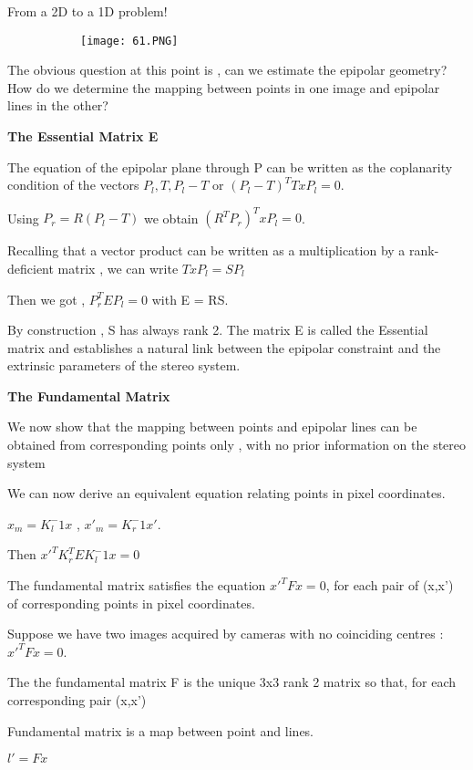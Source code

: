 \documentclass{article}
\begin{document}
From a 2D to a 1D problem!

\begin{figure}[ht!]
  \centering
  \begin{subfigure}[b]{0.6\linewidth}
    \texttt{[image: 61.PNG]}
  \end{subfigure}
\end{figure}

The obvious question at this point is , can we estimate the epipolar geometry? How do we determine the mapping between points in one image and epipolar lines in the other?

\textbf{The Essential Matrix E}

The equation of the epipolar plane through P can be written as the coplanarity condition of the vectors $P_l,T,P_l - T$ or $(P_l - T)^T T x P_l = 0$.

Using  $P_r = R(P_l -T)$ we obtain $(R^T P_r)^T x P_l = 0$.

Recalling that a vector product can be written as a multiplication by a rank-deficient matrix , we can write $T x P_l = SP_l$

Then we got , $P_r^TEP_l = 0$ with E = RS.

By construction , S has always rank 2. The matrix E is called the Essential matrix and establishes a natural link between the epipolar constraint and the extrinsic parameters of the stereo system.

\textbf{The Fundamental Matrix}

We now show that the mapping between points and epipolar lines can be obtained from corresponding points only , with no prior information on the stereo system

We can now derive an equivalent equation relating points in pixel coordinates.

$x_m = K_l^-1x$ , $x'_m = K_r^-1x'$.

Then $x'^TK_r^TEK_l^-1x = 0 $

The fundamental matrix satisfies the equation $x'^TFx = 0$, for each pair of (x,x') of corresponding points in pixel coordinates.

Suppose we have two images acquired by cameras with no coinciding centres : $x'^TFx = 0$.

The the fundamental matrix F is the unique 3x3 rank 2 matrix so that, for each corresponding pair (x,x')

Fundamental matrix is a map between point and lines.

$l'= Fx$
\end{document}
